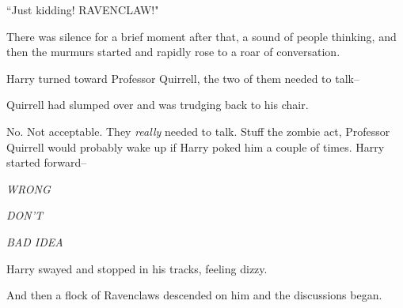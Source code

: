 ``Just kidding! RAVENCLAW!"

There was silence for a brief moment after that, a sound of people thinking, and then the murmurs started and rapidly rose to a roar of conversation.

Harry turned toward Professor Quirrell, the two of them needed to talk\---

Quirrell had slumped over and was trudging back to his chair.

No. Not acceptable. They \emph{really} needed to talk. Stuff the zombie act, Professor Quirrell would probably wake up if Harry poked him a couple of times. Harry started forward\---

\emph{WRONG}

\emph{DON'T}

\emph{BAD IDEA}

Harry swayed and stopped in his tracks, feeling dizzy.

And then a flock of Ravenclaws descended on him and the discussions began.

